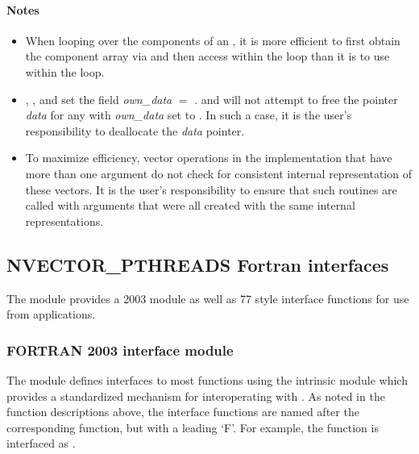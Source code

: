 \paragraph{\bf Notes}

\begin{itemize}

\item
  When looping over the components of an  , it is
  more efficient to first obtain the component array via
   and then access  within the
  loop than it is to use  within the loop.

\item
  {\warn}, ,
  and  set the field
  {\em own\_data} $=$ .
   and 
  will not attempt to free the pointer {\em data} for any  with
  {\em own\_data} set to . In such a case, it is the user's responsibility to
  deallocate the {\em data} pointer.

\item
  {\warn}To maximize efficiency, vector operations in the {\nvecpthreads} implementation
  that have more than one  argument do not check for
  consistent internal representation of these vectors. It is the user's
  responsibility to ensure that such routines are called with 
  arguments that were all created with the same internal representations.

\end{itemize}


\subsection{NVECTOR\_PTHREADS Fortran interfaces}
\label{ss:nvec_pthreads_fortran}

The {\nvecpthreads} module provides a {\F} 2003 module as well as {\F} 77
style interface functions for use from {\F} applications.

\subsubsection*{FORTRAN 2003 interface module}
The  {\F} module defines interfaces to most
{\nvecpthreads} {\CC} functions using the intrinsic 
module which provides a standardized mechanism for interoperating with {\CC}. As
noted in the {\CC} function descriptions above, the interface functions are
named after the corresponding {\CC} function, but with a leading `F'. For
example, the function  is interfaced as
.


